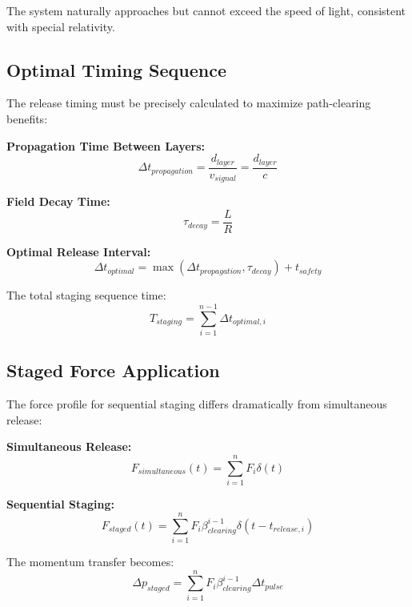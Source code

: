\documentclass[12pt,a4paper]{article}
\begin{document}
The system naturally approaches but cannot exceed the speed of light, consistent with special relativity.

\subsection{Optimal Timing Sequence}

The release timing must be precisely calculated to maximize path-clearing benefits:

\textbf{Propagation Time Between Layers:}
\begin{equation}
\Delta t_{propagation} = \frac{d_{layer}}{v_{signal}} = \frac{d_{layer}}{c}
\end{equation}

\textbf{Field Decay Time:}
\begin{equation}
\tau_{decay} = \frac{L}{R}
\end{equation}

\textbf{Optimal Release Interval:}
\begin{equation}
\Delta t_{optimal} = \max(\Delta t_{propagation}, \tau_{decay}) + t_{safety}
\end{equation}

The total staging sequence time:
\begin{equation}
T_{staging} = \sum_{i=1}^{n-1} \Delta t_{optimal,i}
\end{equation}

\subsection{Staged Force Application}

The force profile for sequential staging differs dramatically from simultaneous release:

\textbf{Simultaneous Release:}
\begin{equation}
F_{simultaneous}(t) = \sum_{i=1}^{n} F_i \delta(t)
\end{equation}

\textbf{Sequential Staging:}
\begin{equation}
F_{staged}(t) = \sum_{i=1}^{n} F_i \beta_{clearing}^{i-1} \delta(t - t_{release,i})
\end{equation}

The momentum transfer becomes:
\begin{equation}
\Delta p_{staged} = \sum_{i=1}^{n} F_i \beta_{clearing}^{i-1} \Delta t_{pulse}
\end{equation}
\end{document}
